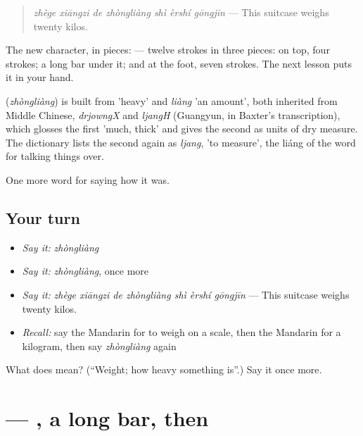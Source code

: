 \begin{quote}
\emph{zhège xiāngzi de zhòngliàng shì èrshí gōngjīn} — This suitcase weighs twenty kilos.
\end{quote}

The new character, in pieces:  — twelve strokes in three pieces:  on top, four strokes; a long bar under it; and  at the foot, seven strokes. The next lesson puts it in your hand.

\begin{cousinweb}
\textbf{} (\emph{zhòngliàng}) is built from  'heavy' and \emph{liàng} 'an amount', both inherited from Middle Chinese, \emph{drjowngX} and \emph{ljangH} (Guangyun, in Baxter's transcription), which glosses the first 'much, thick' and gives the second as units of dry measure. The dictionary lists the second again as \emph{ljang}, 'to measure', the liáng of the word for talking things over.
\end{cousinweb}

\begin{grammarlens}[title={What you've built}]
One more word for saying how it was.
\end{grammarlens}

\subsection*{Your turn}
\begin{itemize}
\raggedright
  \item \emph{Say it:} \emph{zhòngliàng}
  \item \emph{Say it:} \emph{zhòngliàng}, once more
  \item \emph{Say it:} \emph{zhège xiāngzi de zhòngliàng shì èrshí gōngjīn} — This suitcase weighs twenty kilos.
  \item \emph{Recall:} say the Mandarin for to weigh on a scale, then the Mandarin for a kilogram, then say \emph{zhòngliàng} again
\end{itemize}

\begin{tcolorbox}[breakable,colback=teal!4,colframe=teal!35!black,title={Before you move on}]
What does  mean? (\textquotedblleft{}Weight; how heavy something is\textquotedblright{}.) Say it once more.
\end{tcolorbox}
\section[\texorpdfstring{\zh{量} (liàng)}{量 (liàng)}]{ — , a long bar, then }

